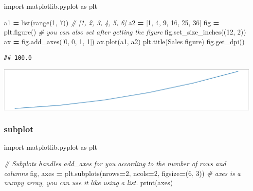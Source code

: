 \documentclass[
]{book}
\newenvironment{Shaded}{\begin{snugshade}}{\end{snugshade}}
\newcommand{\BuiltInTok}[1]{#1}
\newcommand{\CommentTok}[1]{\textcolor[rgb]{0.56,0.35,0.01}{\textit{#1}}}
\newcommand{\DecValTok}[1]{\textcolor[rgb]{0.00,0.00,0.81}{#1}}
\newcommand{\ImportTok}[1]{#1}
\newcommand{\NormalTok}[1]{#1}
\newcommand{\OperatorTok}[1]{\textcolor[rgb]{0.81,0.36,0.00}{\textbf{#1}}}
\newcommand{\StringTok}[1]{\textcolor[rgb]{0.31,0.60,0.02}{#1}}
\theoremstyle{definition}
\theoremstyle{definition}
\theoremstyle{definition}
\theoremstyle{definition}
\theoremstyle{remark}
\begin{document}
\begin{Shaded}
\begin{Highlighting}[]
\ImportTok{import}\NormalTok{ matplotlib.pyplot }\ImportTok{as}\NormalTok{ plt}

\NormalTok{a1 }\OperatorTok{=} \BuiltInTok{list}\NormalTok{(}\BuiltInTok{range}\NormalTok{(}\DecValTok{1}\NormalTok{, }\DecValTok{7}\NormalTok{)) }\CommentTok{\# [1, 2, 3, 4, 5, 6]}
\NormalTok{a2 }\OperatorTok{=}\NormalTok{ [}\DecValTok{1}\NormalTok{, }\DecValTok{4}\NormalTok{, }\DecValTok{9}\NormalTok{, }\DecValTok{16}\NormalTok{, }\DecValTok{25}\NormalTok{, }\DecValTok{36}\NormalTok{]}
\NormalTok{fig }\OperatorTok{=}\NormalTok{ plt.figure()}
\CommentTok{\# you can also set after getting the figure}
\NormalTok{fig.set\_size\_inches((}\DecValTok{12}\NormalTok{, }\DecValTok{2}\NormalTok{))}
\NormalTok{ax }\OperatorTok{=}\NormalTok{ fig.add\_axes([}\DecValTok{0}\NormalTok{, }\DecValTok{0}\NormalTok{, }\DecValTok{1}\NormalTok{, }\DecValTok{1}\NormalTok{])}
\NormalTok{ax.plot(a1, a2)}
\NormalTok{plt.title(}\StringTok{\textquotesingle{}Sales figure\textquotesingle{}}\NormalTok{)}
\NormalTok{fig.get\_dpi()}
\end{Highlighting}
\end{Shaded}

\begin{verbatim}
## 100.0
\end{verbatim}

\includegraphics{202403181222-MatPlotLib_files/figure-latex/unnamed-chunk-24-27.pdf}

\hypertarget{subplot}{%
\subsubsection{subplot}\label{subplot}}

\begin{Shaded}
\begin{Highlighting}[]
\ImportTok{import}\NormalTok{ matplotlib.pyplot }\ImportTok{as}\NormalTok{ plt}

\CommentTok{\# Subplots handles add\_axes for you according to the number of rows and columns}
\NormalTok{fig, axes }\OperatorTok{=}\NormalTok{ plt.subplots(nrows}\OperatorTok{=}\DecValTok{2}\NormalTok{, ncols}\OperatorTok{=}\DecValTok{2}\NormalTok{, figsize}\OperatorTok{=}\NormalTok{(}\DecValTok{6}\NormalTok{, }\DecValTok{3}\NormalTok{))}
\CommentTok{\# axes is a numpy array, you can use it like using a list.}
\BuiltInTok{print}\NormalTok{(axes)}
\end{Highlighting}
\end{Shaded}
\end{document}
